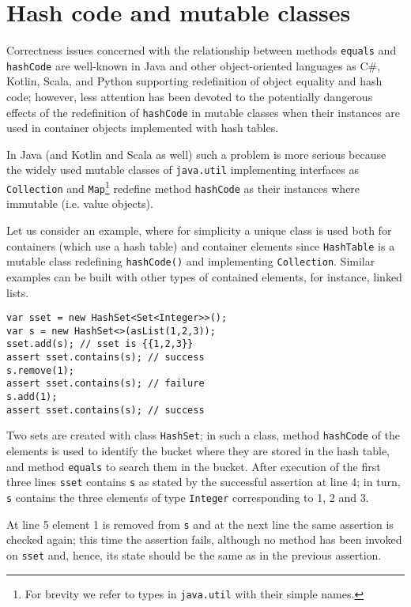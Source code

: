 \section{Hash code and mutable classes}\label{sec:example}

Correctness issues concerned with the relationship between methods \lstinline{equals} and \lstinline{hashCode} are well-known
in Java \cite{Bloch18,OkanoHSON19} and other object-oriented languages as C\#, Kotlin, Scala, and Python supporting redefinition
of object equality and hash code; however, less attention has been devoted to the potentially dangerous effects of the redefinition of 
\lstinline{hashCode} in mutable classes when their instances are used in container objects implemented with hash tables.

In Java (and Kotlin and Scala as well)  such a problem is more serious because the widely used mutable classes of \lstinline{java.util}
implementing interfaces as \lstinline{Collection} and \lstinline{Map}\footnote{For brevity we refer to types in \lstinline{java.util} with their simple names.}  redefine method \lstinline{hashCode} as their instances where immutable (i.e. value objects).

Let us consider an example, where for simplicity a unique class is used both for containers (which use a hash table) and container elements
since \lstinline{HashTable} is a mutable class redefining \lstinline{hashCode()} and implementing \lstinline{Collection}.
Similar examples can be built with other types of contained elements, for instance, linked lists.
\begin{lstlisting}[numbers=right,numbersep=-7pt]
var sset = new HashSet<Set<Integer>>();
var s = new HashSet<>(asList(1,2,3));
sset.add(s); // sset is {{1,2,3}}
assert sset.contains(s); // success
s.remove(1);
assert sset.contains(s); // failure
s.add(1);
assert sset.contains(s); // success
\end{lstlisting}
Two sets are created with class \lstinline{HashSet}; in such a class, method \lstinline{hashCode} of the elements is used to identify the
bucket where they are stored in the hash table, and method \lstinline{equals} to search them in the bucket.
After execution of the first three lines \lstinline{sset} contains \lstinline{s} as stated by the successful assertion at line 4; in turn, \lstinline{s}
contains the three elements of type \lstinline{Integer} corresponding to 1, 2 and 3.

At line 5 element 1 is removed from \lstinline{s} and at the next line the same assertion is checked again; this time the assertion fails, although no method has been invoked on \lstinline{sset} and, hence, its state should be the same as in the previous assertion. 

